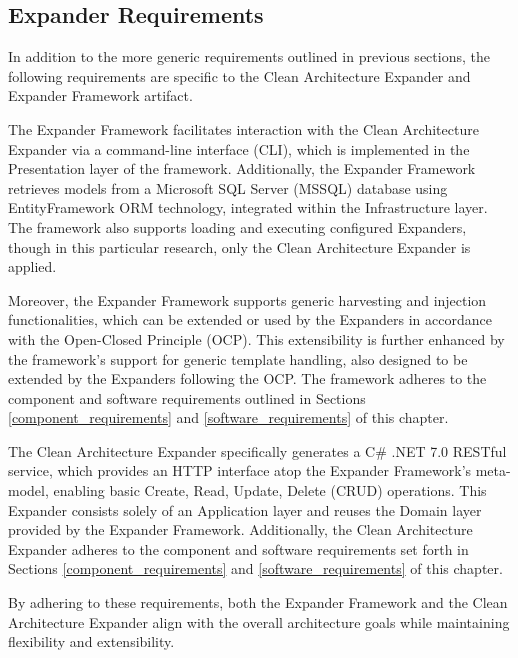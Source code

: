 \subsection{Expander Requirements} \label{expander_framework_requirements}

In addition to the more generic requirements outlined in previous sections, the following
requirements are specific to the Clean Architecture Expander and Expander Framework
artifact.

The Expander Framework facilitates interaction with the Clean Architecture Expander via a
command-line interface (CLI), which is implemented in the Presentation layer of the
framework. Additionally, the Expander Framework retrieves models from a Microsoft SQL
Server (MSSQL) database using EntityFramework ORM technology, integrated within the
Infrastructure layer. The framework also supports loading and executing configured
Expanders, though in this particular research, only the Clean Architecture Expander is
applied.

Moreover, the Expander Framework supports generic harvesting and injection
functionalities, which can be extended or used by the Expanders in accordance with the
Open-Closed Principle (OCP). This extensibility is further enhanced by the framework's
support for generic template handling, also designed to be extended by the Expanders
following the OCP. The framework adheres to the component and software requirements
outlined in Sections \ref{component_requirements} and \ref{software_requirements} of this
chapter.

The Clean Architecture Expander specifically generates a C\# .NET 7.0 RESTful service,
which provides an HTTP interface atop the Expander Framework’s meta-model, enabling basic
Create, Read, Update, Delete (CRUD) operations. This Expander consists solely of an
Application layer and reuses the Domain layer provided by the Expander Framework.
Additionally, the Clean Architecture Expander adheres to the component and software
requirements set forth in Sections \ref{component_requirements} and
\ref{software_requirements} of this chapter.

By adhering to these requirements, both the Expander Framework and the Clean Architecture
Expander align with the overall architecture goals while maintaining flexibility and
extensibility.
